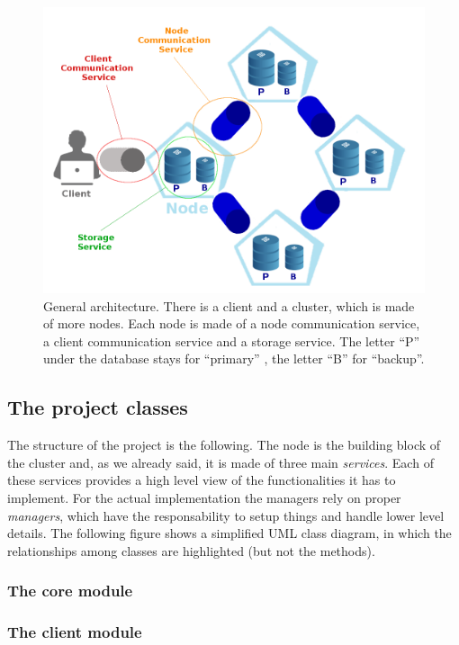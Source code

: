 \documentclass{article}
\begin{document}
\begin{figure}[h]
\includegraphics[scale=0.35]{architecture}
\caption{General architecture. There is a client and a cluster, which is made of more nodes. Each node is made of a node communication service, a client communication service and a storage service. The letter ``P'' under the database stays for ``primary'' , the letter ``B'' for ``backup''.}
\end{figure}

\subsection{The project classes} 
The structure of the project is the following. The node is the building block of the cluster and, as we already said, it is made of three main \textit{services}. Each of these services provides a high level view of the functionalities it has to implement. For the actual implementation the managers rely on proper \textit{managers}, which have the responsability to setup things and handle lower level details. The following figure shows a simplified UML class diagram, in which the relationships among classes are highlighted (but not the methods).

\subsubsection{The core module} 

\subsubsection{The client module} 
\end{document}
